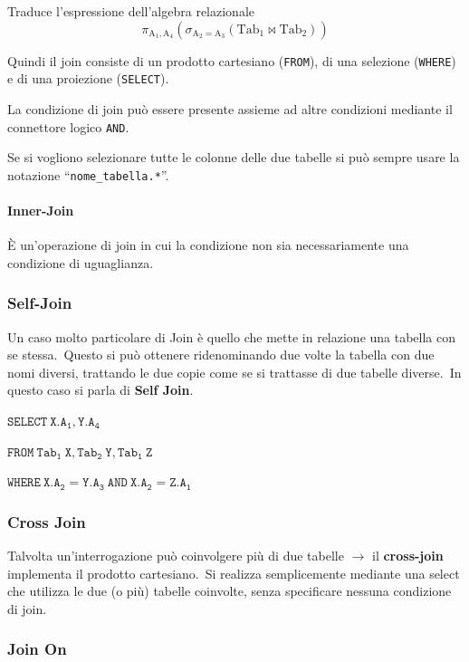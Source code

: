 \noindent Traduce l'espressione dell'algebra relazionale
\[\pi_{\mathrm{A_1,A_4}} (\sigma_{\mathrm{A_2=A_3}} (\mathrm{Tab_1} \Join \mathrm{Tab_2}))\]

\noindent Quindi il join consiste di un prodotto cartesiano (\texttt{FROM}), di una selezione (\texttt{WHERE}) e di una proiezione (\texttt{SELECT}).

La condizione di join può essere presente assieme ad altre condizioni mediante il connettore logico \texttt{AND}.

Se si vogliono selezionare tutte le colonne delle due tabelle si può sempre usare la notazione ``\verb|nome_tabella.*|''.

\paragraph{Inner-Join}
È un'operazione di join in cui la condizione non sia necessariamente una condizione di uguaglianza.\

\subsubsection{Self-Join}

Un caso molto particolare di Join è quello che mette in relazione una tabella con se stessa.\
Questo si può ottenere ridenominando due volte la tabella con due nomi diversi, trattando le due copie come se si trattasse di due tabelle diverse.\
In questo caso si parla di \textbf{Self Join}.

\begin{flushleft}
	$\mathtt{SELECT\ X.A_1, Y.A_4}$

	$\mathtt{FROM\ Tab_1\ X, Tab_2\ Y, Tab_1\ Z}$

	$\mathtt{WHERE\ X.A_2 = Y.A_3\ AND\ X.A_2 = Z.A_1}$
\end{flushleft}

\subsubsection{Cross Join}

Talvolta un'interrogazione può coinvolgere più di due tabelle $\rightarrow$ il \textbf{cross-join} implementa il prodotto cartesiano.\
Si realizza semplicemente mediante una select che utilizza le due (o più) tabelle coinvolte, senza specificare nessuna condizione di join.

\subsubsection{Join On}

